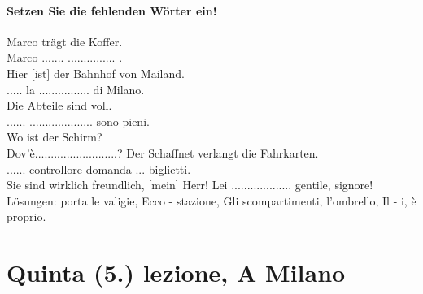 \documentclass{article}
\begin{document}
\paragraph{Setzen Sie die fehlenden Wörter ein!}


Marco trägt die Koffer.\\
Marco ....... ............... .\\
Hier [ist] der Bahnhof von Mailand.\\
..... la ................ di Milano.\\
Die Abteile sind voll.\\
...... .................... sono pieni.\\
Wo ist der Schirm?\\
Dov'è..........................?
Der Schaffnet verlangt die Fahrkarten.\\
...... controllore domanda ... biglietti.\\
Sie sind wirklich freundlich, [mein] Herr!
Lei ................... gentile, signore!\\

Lösungen: porta le valigie, Ecco - stazione, Gli scompartimenti, l'ombrello,
Il - i, è proprio.

\section{Quinta (5.) lezione, A Milano}
\end{document}
